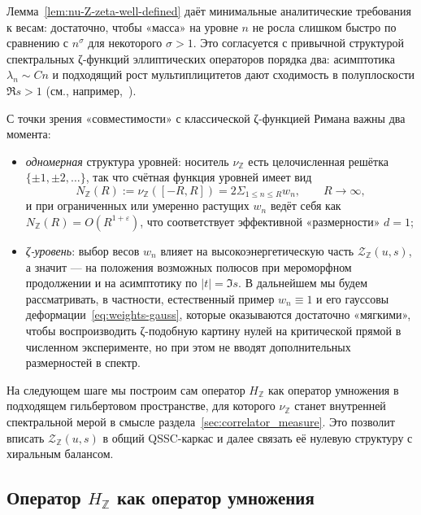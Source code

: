 \documentclass{article}
\numberwithin{equation}{section}
\theoremstyle{plain}
\theoremstyle{definition}
\theoremstyle{remark}
\def\infty{∞}\def\partial{∂}\def\sum{Σ}\def\int{∫}%
\begin{document}
\noindent
Лемма~\ref{lem:nu-Z-zeta-well-defined} даёт минимальные аналитические
требования к весам: достаточно, чтобы «масса» на уровне \(n\) не росла
слишком быстро по сравнению с \(n^\sigma\) для некоторого \(\sigma>1\).
Это согласуется с привычной структурой спектральных ζ-функций эллиптических
операторов порядка два: асимптотика \(\lambda_n\sim Cn\) и подходящий рост
мультиплицитетов дают сходимость в полуплоскости \(\Re s>1\)
(см., например,~\cite{Seeley1967,Gilkey1995}).

С точки зрения «совместимости» с классической ζ-функцией Римана важны два
момента:

\begin{itemize}[leftmargin=2.2em]
  \item \emph{одномерная} структура уровней: носитель \(\nu_{\mathbb Z}\) есть
  целочисленная решётка \(\{\pm 1,\pm 2,\dots\}\), так что счётная функция
  уровней имеет вид
  \begin{equation}
  \label{eq:nu-Z-counting}
  N_{\mathbb Z}(R)
  :=
  \nu_{\mathbb Z}([-R,R])
  =
  2\sum_{1\le n\le R} w_n,
  \qquad R\to\infty,
  \end{equation}
  и при ограниченных или умеренно растущих \(w_n\) ведёт себя как
  \(N_{\mathbb Z}(R)=O(R^{1+\varepsilon})\), что соответствует эффективной
  «размерности» \(d=1\);

  \item \emph{ζ-уровень}: выбор весов \(w_n\) влияет на высокоэнергетическую
  часть \(\mathcal Z_{\mathbb Z}(u,s)\), а значит — на положения возможных
  полюсов при мероморфном продолжении и на асимптотику по \(|t|=\Im s\).
  В дальнейшем мы будем рассматривать, в частности, естественный пример
  \(w_n\equiv 1\) и его гауссовы деформации~\eqref{eq:weights-gauss},
  которые оказываются достаточно «мягкими», чтобы воспроизводить
  ζ-подобную картину нулей на критической прямой в численном эксперименте,
  но при этом не вводят дополнительных размерностей в спектр.
\end{itemize}

\noindent
На следующем шаге мы построим сам оператор \(H_{\mathbb Z}\) как оператор
умножения в подходящем гильбертовом пространстве, для которого
\(\nu_{\mathbb Z}\) станет внутренней спектральной мерой в смысле
раздела~\ref{sec:correlator_measure}. Это позволит вписать
\(\mathcal Z_{\mathbb Z}(u,s)\) в общий QSSC-каркас и далее связать её
нулевую структуру с хиральным балансом.


\subsection{Оператор \(H_{\mathbb Z}\) как оператор умножения}
\label{subsec:integer-operator-definition}
\end{document}
